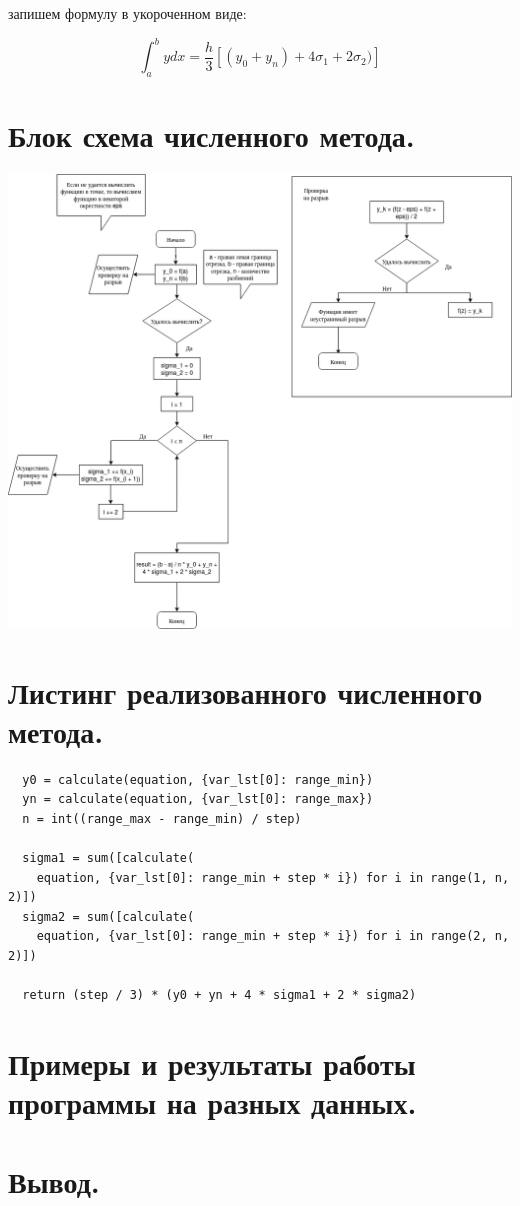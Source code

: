 \documentclass[11pt, a4paper]{article}
\begin{document}
запишем формулу в укороченном виде:

\begin{equation*}
  \int_a^b y dx = \dfrac{h}{3} [(y_0 + y_n) + 4 \sigma_1 + 2 \sigma_2)]
\end{equation*}


\section{Блок схема численного метода.}

\includegraphics[width=\linewidth]{draw.png}

\section{Листинг реализованного численного метода.}

\begin{verbatim}
  y0 = calculate(equation, {var_lst[0]: range_min})
  yn = calculate(equation, {var_lst[0]: range_max})
  n = int((range_max - range_min) / step)

  sigma1 = sum([calculate(
    equation, {var_lst[0]: range_min + step * i}) for i in range(1, n, 2)])
  sigma2 = sum([calculate(
    equation, {var_lst[0]: range_min + step * i}) for i in range(2, n, 2)])

  return (step / 3) * (y0 + yn + 4 * sigma1 + 2 * sigma2)
\end{verbatim}

\section{Примеры и результаты работы программы на разных данных.}


\section{Вывод.}
\end{document}
